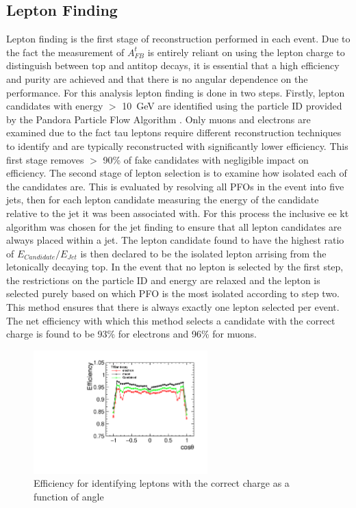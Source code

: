 \subsection{Lepton Finding}
\label{sec:lepfinding}
Lepton finding is the first stage of reconstruction performed in each event. Due to the fact the measurement of $A_{FB}^{t}$ is entirely reliant on using the lepton charge to distinguish between top and antitop decays, it is essential that a high efficiency and purity are achieved and that there is no angular dependence on the performance. For this analysis lepton finding is done in two steps. Firstly, lepton candidates with energy $>$ 10~GeV are identified using the particle ID provided by the Pandora Particle Flow Algorithm \cite{Thomson200925}. Only muons and electrons are examined due to the fact tau leptons require different reconstruction techniques to identify and are typically reconstructed with significantly lower efficiency. This first stage removes $>$ 90\% of fake candidates with negligible impact on efficiency. The second stage of lepton selection is to examine how isolated each of the candidates are. This is evaluated by resolving all PFOs in the event into five jets, then for each lepton candidate measuring the energy of the candidate relative to the jet it was been associated with. For this process the inclusive ee kt algorithm was chosen for the jet finding to ensure that all lepton candidates are always placed within a jet. The lepton candidate found to have the highest ratio of $E_{Candidate}/E_{Jet}$ is then declared to be the isolated lepton arrising from the letonically decaying top. In the event that no lepton is selected by the first step, the restrictions on the particle ID and energy are relaxed and the lepton is selected purely based on which PFO is the most isolated according to step two. This method ensures that there is always exactly one lepton selected per event. The net efficiency with which this method selects a candidate with the correct charge is found to be 93\% for electrons and 96\% for muons.

\begin{figure}
  \centering
  \includegraphics[width=0.6\textwidth]{TopAnalysis/figures/NetEfficiencys.pdf}
  \caption[Charge Tagging Efficiency]{Efficiency for identifying leptons with the correct charge as a function of angle}
  \label{fig:netefficiency}
\end{figure}


